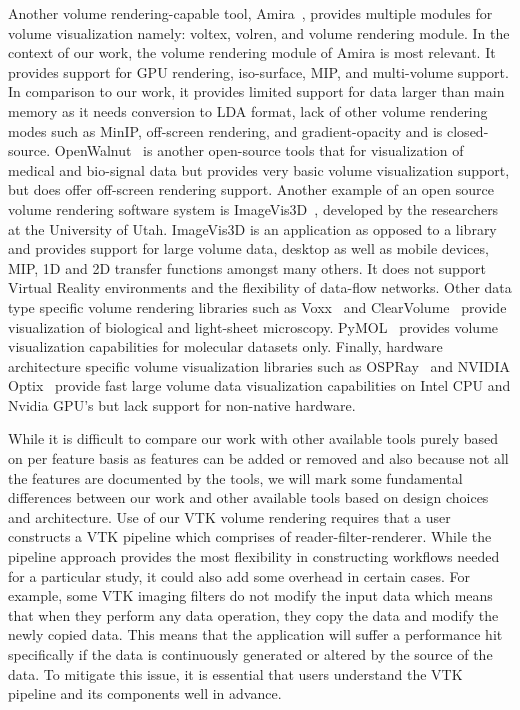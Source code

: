 Another volume rendering-capable tool, Amira~\citep{stalling2005amira}, provides
multiple modules for volume visualization namely: voltex, volren, and volume
rendering module. In the context of our work, the volume rendering module of
Amira is most relevant. It provides support for GPU rendering, iso-surface, MIP,
and multi-volume support. In comparison to our work, it provides limited support
for data larger than main memory as it needs conversion to LDA format, lack of
other volume rendering modes such as MinIP, off-screen rendering, and
gradient-opacity and is closed-source.
OpenWalnut~\citep{eichelbaum2010openwalnut} is another open-source tools that
for visualization of medical and bio-signal data but provides very basic volume
visualization support, but does offer off-screen rendering support. Another
example of an open source volume rendering software system is
ImageVis3D~\citep{cibc_imagevis3D:_2016}, developed by the researchers at the
University of Utah. ImageVis3D is an application as opposed to a library and
provides support for large volume data, desktop as well as mobile devices, MIP,
1D and 2D transfer functions amongst many others.  It does not support Virtual
Reality environments and the flexibility of data-flow networks. Other data type
specific volume rendering libraries such as Voxx~\citep{clendenon_voxx:_2002}
and ClearVolume~\citep{royer_clearvolume:_2015} provide visualization of
biological and light-sheet microscopy.  PyMOL~\citep{schrodinger_llc_pymol_2015}
provides volume visualization capabilities for molecular datasets only. Finally,
hardware architecture specific volume visualization libraries such as
OSPRay~\citep{wald_ospray_2017} and NVIDIA\textsuperscript{\textregistered}
Optix\textsuperscript{\texttrademark}~\citep{parker_optix:_2010} provide fast
large volume data visualization capabilities on Intel CPU and Nvidia GPU's but
lack support for non-native hardware.

While it is difficult to compare our work with other available tools purely
based on per feature basis as features can be added or removed and also because
not all the features are documented by the tools, we will mark some fundamental
differences between our work and other available tools based on design choices
and architecture. Use of our VTK volume rendering requires that a user
constructs a VTK pipeline which comprises of reader-filter-renderer. While the
pipeline approach provides the most flexibility in constructing workflows needed
for a particular study, it could also add some overhead in certain cases. For
example, some VTK imaging filters do not modify the input data which means that
when they perform any data operation, they copy the data and modify the newly
copied data. This means that the application will suffer a performance hit
specifically if the data is continuously generated or altered by the source of
the data. To mitigate this issue, it is essential that users understand the VTK
pipeline and its components well in advance.

